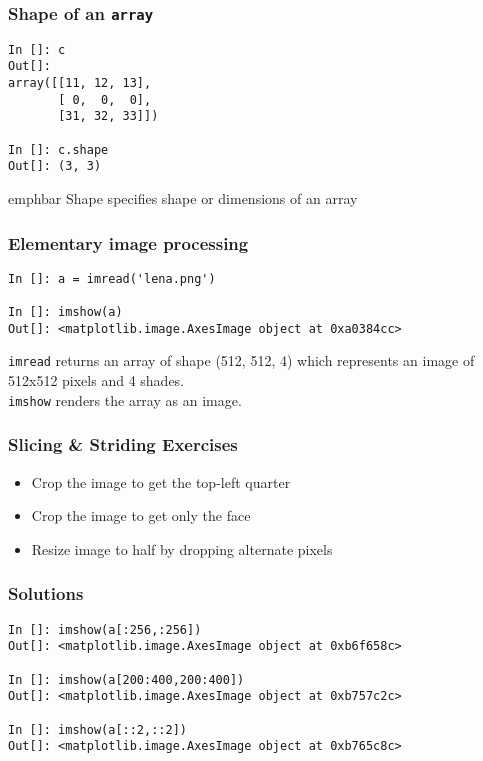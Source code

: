 \documentclass[14pt,compress]{beamer}
\newcommand{\emphbar}[1]
{\begin{beamercolorbox}[rounded=true]{emphbar} 
      {#1}
 \end{beamercolorbox}
}
\newcommand{\typ}[1]{\lstinline{#1}}
\begin{document}
\begin{frame}[fragile]
  \frametitle{Shape of an \typ{array}}
  \begin{lstlisting}
In []: c
Out[]: 
array([[11, 12, 13],
       [ 0,  0,  0],
       [31, 32, 33]])

In []: c.shape
Out[]: (3, 3)
  \end{lstlisting}
\emphbar{Shape specifies shape or dimensions of an array}
\end{frame}

\begin{frame}[fragile]
  \frametitle{Elementary image processing}
\begin{small}
  \begin{lstlisting}
In []: a = imread('lena.png')

In []: imshow(a)
Out[]: <matplotlib.image.AxesImage object at 0xa0384cc>
  \end{lstlisting}
  \end{small}
\typ{imread} returns an array of shape (512, 512, 4) which represents an image of 512x512 pixels and 4 shades.\\
\typ{imshow} renders the array as an image.
\end{frame}

\begin{frame}[fragile]
\frametitle{Slicing \& Striding Exercises}
  \begin{itemize}
  \item Crop the image to get the top-left quarter
  \item Crop the image to get only the face
  \item Resize image to half by dropping alternate pixels
  \end{itemize}

\end{frame}
\begin{frame}[fragile]
  \frametitle{Solutions}
\begin{small}
  \begin{lstlisting}
In []: imshow(a[:256,:256])
Out[]: <matplotlib.image.AxesImage object at 0xb6f658c>

In []: imshow(a[200:400,200:400])
Out[]: <matplotlib.image.AxesImage object at 0xb757c2c>

In []: imshow(a[::2,::2])
Out[]: <matplotlib.image.AxesImage object at 0xb765c8c>
  \end{lstlisting}
\end{small}
\end{frame}
\end{document}
